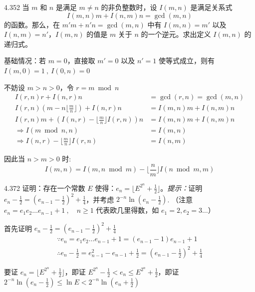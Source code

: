 \begin{problem}{4.35}{2}
  当 \( m \) 和 \( n \) 是满足 \( m \neq n \) 的非负整数时，设 \( I(m,n) \) 是满足关系式
  \[
    I(m,n)m + I(n,m)n = \gcd(m,n)
  \]
  的函数。那么，在 \( m'm + n'n = \gcd(m,n) \) 中有 \( I(m,n) = m' \) 以及 \( I(n,m) = n' \)，\( I(m,n) \) 的值是 \( m \) 关于 \( n \) 的一个逆元。求出定义 \( I(m,n) \) 的递归式。
\end{problem}

基础情况：若 \( m = 0 \)，直接取 \( m'=0 \) 以及 \( n'=1 \) 使等式成立，则有 \( I(m,0) = 1 \ , \ I(0,n) = 0 \)

不妨设 \( m > n > 0 \)，令 \( r = m \bmod n \)
\begin{align*}
  I(r,n) r + I(n,r) n &= \gcd(r,n) = \gcd(m,n) \\
  I(r,n) (m - n \lfloor \frac{m}{n} \rfloor) + I(n,r) n &= I(m,n)m + I(n,m)n \\
  I(r,n) m  + (I(n,r) - \lfloor \frac{m}{n} \rfloor I(r,n)) n &= I(m,n)m + I(n,m)n \\
  \Rightarrow I(m \bmod n, n) &= I(m,n) \\
  \Rightarrow I(n,r) - \lfloor \frac{m}{n} \rfloor I(r,n) &= I(n,m)
\end{align*}

因此当 \( n > m > 0 \) 时:
\[
  I(m,n) = I(m, n \bmod m) - \lfloor \frac{n}{m} \rfloor I(n \bmod m,m)
\]

\begin{problem}{4.37}{2}
  证明：存在一个常数 \( E \) 使得：\( e_n = \lfloor E^{2^n} + \frac{1}{2} \rfloor \)。\textit{提示：}证明 \( e_n - \frac{1}{2} = (e_{n-1} - \frac{1}{2})^2 + \frac{1}{4} \)，并考虑 \( 2^{-n} \ln{(e_n - \frac{1}{2})} \).
  （注意 \( e_n = e_1 e_2 \dots e_{n-1} + 1 \ , \quad n \ge 1 \) 代表欧几里得数，如 \( e_1 = 2, e_2 = 3 \dots \)）
\end{problem}

首先证明 \( e_n - \frac{1}{2} = (e_{n-1} - \frac{1}{2})^2 + \frac{1}{4} \)
\begin{gather*}
  \because e_n = e_1 e_2 \dots e_{n-1} + 1 = (e_{n-1} - 1) e_{n-1} + 1 \\
  \therefore e_n - \frac{1}{2} = e_{n-1}^2 - e_{n-1} + \frac{1}{2} = (e_{n-1} - \frac{1}{2})^2 + \frac{1}{4}
\end{gather*}

要证 \( e_n = \lfloor E^{2^n} + \frac{1}{2} \rfloor \)，即证 \( E^{2^n} - \frac{1}{2} < e_n \le E^{2^n} + \frac{1}{2} \)，即证 \( 2^{-n} \ln{(e_n - \frac{1}{2})} \le \ln{E} < 2^{-n} \ln{(e_n + \frac{1}{2})} \)

